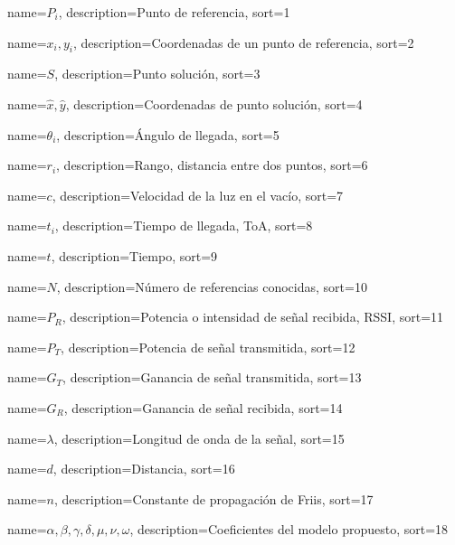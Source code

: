 \makeglossaries

{
  name={\ensuremath{P_i}},
  description={Punto de referencia},
  sort=1
}

{
  name={\ensuremath{x_i, y_i}},
  description={Coordenadas de un punto de referencia},
  sort=2
}

{
  name={\ensuremath{S}},
  description={Punto solución},
  sort=3
}

{
  name={\ensuremath{\hat{x}, \hat{y}}},
  description={Coordenadas de punto solución},
  sort=4
}

{
  name={\ensuremath{\theta_i}},
  description={Ángulo de llegada},
  sort=5
}

{
  name={\ensuremath{r_i}},
  description={Rango, distancia entre dos puntos},
  sort=6
}

{
  name={\ensuremath{c}},
  description={Velocidad de la luz en el vacío},
  sort=7
}

{
  name={\ensuremath{t_i}},
  description={Tiempo de llegada, ToA},
  sort=8
}

{
  name={\ensuremath{t}},
  description={Tiempo},
  sort=9
}

{
  name={\ensuremath{N}},
  description={Número de referencias conocidas},
  sort=10
}

{
  name={\ensuremath{P_R}},
  description={Potencia o intensidad de señal recibida, RSSI},
  sort=11
}

{
  name={\ensuremath{P_T}},
  description={Potencia de señal transmitida},
  sort=12
}

{
  name={\ensuremath{G_T}},
  description={Ganancia de señal transmitida},
  sort=13
}

{
  name={\ensuremath{G_R}},
  description={Ganancia de señal recibida},
  sort=14
}

{
  name={\ensuremath{\lambda}},
  description={Longitud de onda de la señal},
  sort=15
}

{
  name={\ensuremath{d}},
  description={Distancia},
  sort=16
}

{
  name={\ensuremath{n}},
  description={Constante de propagación de Friis},
  sort=17
}

{
  name={\ensuremath{\alpha, \beta, \gamma, \delta, \mu, \nu, \omega}},
  description={Coeficientes del modelo propuesto},
  sort=18
}

